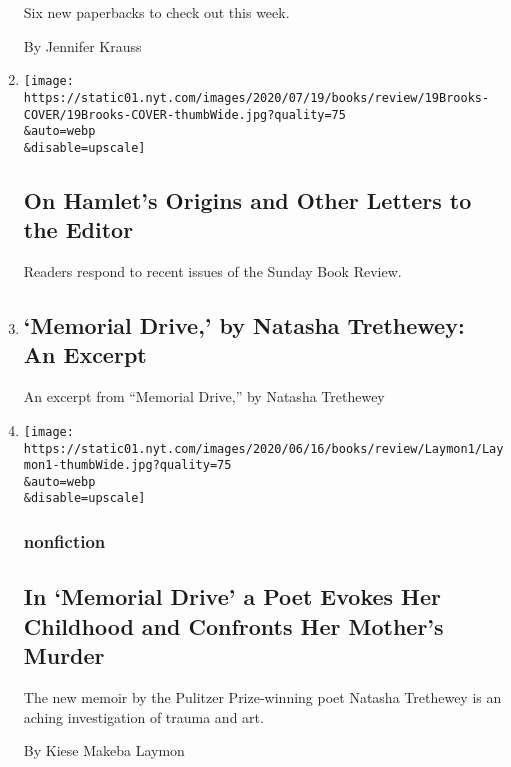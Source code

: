 \begin{enumerate}
  Six new paperbacks to check out this week.

  By Jennifer Krauss
\item
  \href{/2020/07/31/books/review/on-hamlets-origins-and-other-letters-to-the-editor.html}{}

  \texttt{[image: https://static01.nyt.com/images/2020/07/19/books/review/19Brooks-COVER/19Brooks-COVER-thumbWide.jpg?quality=75\\\&auto=webp\\\&disable=upscale]}

  \hypertarget{on-hamlets-origins-and-other-letters-to-the-editor}{%
  \subsection{On Hamlet's Origins and Other Letters to the
  Editor}\label{on-hamlets-origins-and-other-letters-to-the-editor}}

  Readers respond to recent issues of the Sunday Book Review.
\item
  \href{/2020/07/30/books/review/memorial-drive-by-natasha-trethewey-an-excerpt.html}{}

  \hypertarget{memorial-drive-by-natasha-trethewey-an-excerpt}{%
  \subsection{`Memorial Drive,' by Natasha Trethewey: An
  Excerpt}\label{memorial-drive-by-natasha-trethewey-an-excerpt}}

  An excerpt from ``Memorial Drive,'' by Natasha Trethewey
\item
  \href{/2020/07/30/books/review/memorial-drive-natastha-trethewey.html}{}

  \texttt{[image: https://static01.nyt.com/images/2020/06/16/books/review/Laymon1/Laymon1-thumbWide.jpg?quality=75\\\&auto=webp\\\&disable=upscale]}

  \hypertarget{nonfiction-4}{%
  \subsubsection{nonfiction}\label{nonfiction-4}}

  \hypertarget{in-memorial-drive-a-poet-evokes-her-childhood-and-confronts-her-mothers-murder}{%
  \subsection{In `Memorial Drive' a Poet Evokes Her Childhood and
  Confronts Her Mother's
  Murder}\label{in-memorial-drive-a-poet-evokes-her-childhood-and-confronts-her-mothers-murder}}

  The new memoir by the Pulitzer Prize-winning poet Natasha Trethewey is
  an aching investigation of trauma and art.

  By Kiese Makeba Laymon
\end{enumerate}

